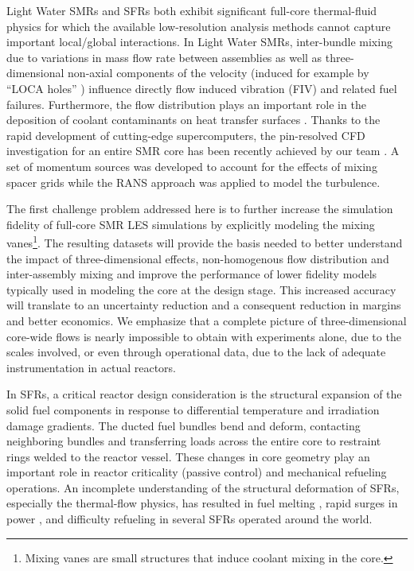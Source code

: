 Light Water SMRs and SFRs both exhibit significant full-core thermal-fluid
physics for which the available low-resolution analysis methods cannot capture
important local/global interactions. In Light Water SMRs, inter-bundle mixing
due to variations in mass flow rate between assemblies as well as three-dimensional non-axial components
of the velocity (induced for example by ``LOCA holes'' \cite{jacques1997flow}) influence directly flow induced vibration (FIV) and related fuel failures.
Furthermore, the flow distribution plays an important role in the deposition of coolant contaminants on heat transfer
surfaces \cite{petrov2016prediction}. Thanks to the rapid
development of cutting-edge supercomputers, the pin-resolved CFD investigation
for an entire SMR core has been recently achieved by our team \cite{Fang2021}.
A set of momentum sources was developed to account for the effects of mixing
spacer grids while the RANS approach was applied to model the turbulence.

The first challenge problem addressed here is to further increase the simulation
fidelity of full-core SMR LES simulations by
 explicitly modeling the mixing vanes\footnote{Mixing vanes are small structures that induce coolant mixing in the core.}.
 The resulting datasets will provide the basis needed to better understand the impact of three-dimensional effects, non-homogenous flow distribution and inter-assembly mixing and improve the performance of lower fidelity models typically used in modeling the core at the design stage. This increased accuracy will translate to an uncertainty reduction and a consequent reduction in margins and better economics. We emphasize that a complete picture of three-dimensional core-wide flows is nearly impossible to obtain with experiments alone, due to the scales involved, or even through operational data, due to the lack of adequate instrumentation in actual reactors. 

In SFRs, a critical reactor design consideration is the structural expansion of
the solid fuel components in response to differential temperature and
irradiation damage gradients. The ducted fuel bundles bend and deform,
contacting neighboring bundles and transferring loads across the entire core to
restraint rings welded to the reactor vessel. These changes in core geometry
play an important role in reactor criticality (passive control) and mechanical
refueling operations.  An incomplete understanding of the structural
deformation of SFRs, especially the thermal-flow physics, has resulted in fuel
melting \cite{brittan}, rapid surges in power \cite{chaumont}, and difficulty
refueling \cite{shields} in several SFRs operated around the world.

